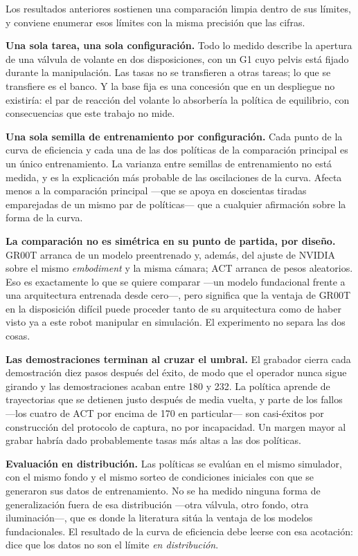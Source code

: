 Los resultados anteriores sostienen una comparación limpia dentro de sus límites, y conviene
enumerar esos límites con la misma precisión que las cifras.

\textbf{Una sola tarea, una sola configuración.} Todo lo medido describe la apertura de una válvula
de volante en dos disposiciones, con un G1 cuyo pelvis está fijado durante la manipulación. Las
tasas no se transfieren a otras tareas; lo que se transfiere es el banco. Y la base fija es una
concesión que en un despliegue no existiría: el par de reacción del volante lo absorbería la
política de equilibrio, con consecuencias que este trabajo no mide.

\textbf{Una sola semilla de entrenamiento por configuración.} Cada punto de la curva de eficiencia
y cada una de las dos políticas de la comparación principal es un único entrenamiento. La varianza
entre semillas de entrenamiento no está medida, y es la explicación más probable de las
oscilaciones de la curva. Afecta menos a la comparación principal —que se apoya en doscientas
tiradas emparejadas de un mismo par de políticas— que a cualquier afirmación sobre la forma de la
curva.

\textbf{La comparación no es simétrica en su punto de partida, por diseño.} GR00T arranca de un
modelo preentrenado y, además, del ajuste de NVIDIA sobre el mismo \textit{embodiment} y la misma
cámara; ACT arranca de pesos aleatorios. Eso es exactamente lo que se quiere comparar —un modelo
fundacional frente a una arquitectura entrenada desde cero—, pero significa que la ventaja de GR00T
en la disposición difícil puede proceder tanto de su arquitectura como de haber visto ya a este
robot manipular en simulación. El experimento no separa las dos cosas.

\textbf{Las demostraciones terminan al cruzar el umbral.} El grabador cierra cada demostración diez
pasos después del éxito, de modo que el operador nunca sigue girando y las demostraciones acaban
entre 180\textdegree{} y 232\textdegree. La política aprende de trayectorias que se detienen justo
después de media vuelta, y parte de los fallos —los cuatro de ACT por encima de 170\textdegree{}
en particular— son casi-éxitos por construcción del protocolo de captura, no por incapacidad. Un
margen mayor al grabar habría dado probablemente tasas más altas a las dos políticas.

\textbf{Evaluación en distribución.} Las políticas se evalúan en el mismo simulador, con el mismo
fondo y el mismo sorteo de condiciones iniciales con que se generaron sus datos de entrenamiento.
No se ha medido ninguna forma de generalización fuera de esa distribución —otra válvula, otro
fondo, otra iluminación—, que es donde la literatura sitúa la ventaja de los modelos fundacionales.
El resultado de la curva de eficiencia debe leerse con esa acotación: dice que los datos no son el
límite \textit{en distribución}.

